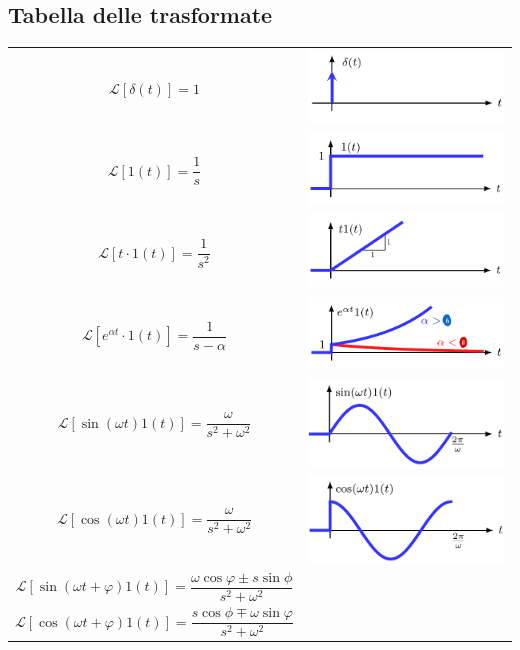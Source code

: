 \documentclass{article}
\numberwithin{equation}{subsection}
\let\oldsubsection\subsection%
\renewcommand{\subsection}{%
  \renewcommand{\theequation}{\thesubsection.\arabic{equation}}%
  \oldsubsection}%
\begin{document}
\subsection{Tabella delle trasformate}\label{Tabella delle trasformate}

\begin{center}
    \renewcommand{\arraystretch}{5}
    \begin{tabular}{c c}
        $\mathcal{L}[\delta(t)]=1$ & 
        \includegraphics[width=0.25\linewidth, valign=c]{Images/Delta.png}
        \\
        $\mathcal{L}[1(t)]=\dfrac{1}{s}$ & 
        \includegraphics[width=0.25\linewidth, valign=c]{Images/Scalino.png}
        \\
        $\mathcal{L}[t \cdot 1(t)]=\dfrac{1}{s^2}$ & 
        \includegraphics[width=0.25\linewidth, valign=c]{Images/Scalino_2.png}
        \\
        $\mathcal{L}[e^{\alpha t} \cdot 1(t)]=\dfrac{1}{s-\alpha}$ & 
        \includegraphics[width=0.25\linewidth, valign=c]{Images/Scalino_3.png}\\
        $\mathcal{L}[\sin(\omega t)1(t)]= \dfrac{\omega}{s^2+\omega^2}$ & \includegraphics[width=0.25\linewidth, valign=c]{Images/Trasformata_seno.png}\\
        $\mathcal{L}[\cos(\omega t)1(t)]= \dfrac{\omega}{s^2+\omega^2}$ & \includegraphics[width=0.25\linewidth, valign=c]{Images/Trasformata_coseno.png}\\
        $\mathcal{L}[\sin(\omega t + \varphi)1(t)]= \dfrac{\omega \cos\varphi \pm s \sin\phi}{s^2+\omega^2}$\\
        $\mathcal{L}[\cos(\omega t + \varphi)1(t)]= \dfrac{s \cos\phi \mp \omega \sin\varphi}{s^2+\omega^2}$
    \end{tabular}
\end{center}
\end{document}
